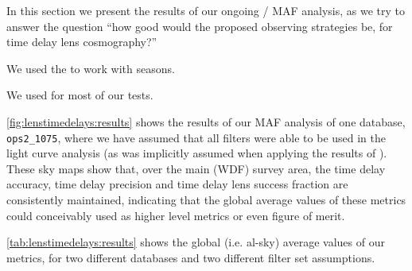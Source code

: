 
In this section we present the results of our ongoing \OpSim / MAF
analysis, as we try to
answer the question ``how good would the proposed observing
strategies be, for time delay lens cosmography?''

We used the
 to work
with seasons.

We used  for most of our tests.


\autoref{fig:lenstimedelays:results} shows the results of our MAF
analysis of one \OpSim database, \texttt{ops2\_1075}, where we have
assumed that all filters were able to be used in the light curve
analysis (as was implicitly assumed when applying the results of
\citeauthor{LiaoEtal2015}). These sky maps show that, over the main
(WDF) survey area, the time delay accuracy, time delay precision and
time delay lens success fraction are consistently maintained,
indicating that the global average values of these metrics could
conceivably used as higher level metrics or even figure of merit.

\autoref{tab:lenstimedelays:results} shows the global (i.e. al-sky)
average values of our metrics, for two different \OpSim
databases and two different filter set assumptions.



